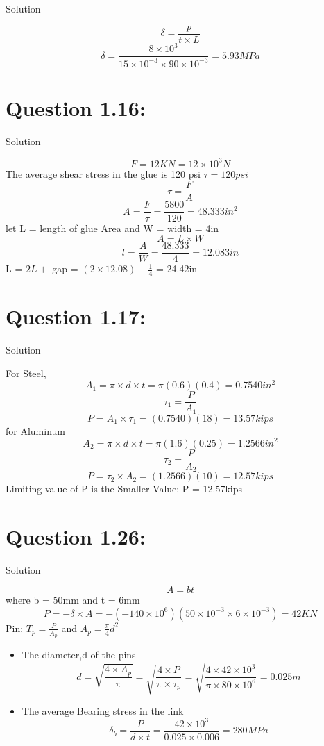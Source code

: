 \documentclass{article}
\begin{document}
\begin{center} Solution \end{center}

\[ \delta = \frac{p}{t \times L}\]
\[ \delta = \frac{8\times 10^{3}}{15 \times 10^{-3} \times 90 \times 10^{-3}} = 5.93MPa\]




\section*{\textbf{Question 1.16:}}

 \begin{center} Solution\end{center}

\[F = 12KN = 12 \times 10^{3}N\]
The average shear stress in the glue is 120 psi $\tau = 120psi$
\[\tau = \frac{F}{A} \]
\[A = \frac{F}{\tau} = \frac{5800}{120} = 48.333in^{2}\]
let L = length of glue Area and W =  width = 4in
\[A= L \times W\]
\[l = \frac{A}{W} = \frac{48.333}{4} = 12.083in\]
 L = $2L +$ gap = $(2\times 12.08)+ \frac{1}{4}$ = 24.42in

\section*{\textbf{Question 1.17:}}

\begin{center} Solution \end{center}
For Steel, 
\[A_{1} = \pi \times d\times t= \pi (0.6)(0.4) = 0.7540in^{2}\]
\[\tau_{1} = \frac{P}{A_{1}}\]
\[P = A_{1}\times\tau_{1} = (0.7540)(18) = 13.57kips\]
for Aluminum 
\[A_{2} = \pi\times d\times t = \pi(1.6)(0.25) = 1.2566in^{2}\]
\[\tau_{2} = \frac{P}{A_{2}}\]
\[P= \tau_{2} \times A_{2} = (1.2566)(10)= 12.57kips\]
Limiting value of P is the Smaller Value: P = 12.57kips



\section*{\textbf{Question 1.26:}}

\begin{center} Solution \end{center}
\[A = bt\]
where b = 50mm and t = 6mm
\[P = -\delta \times A = -(-140 \times 10^{6})(50 \times 10^{-3} \times 6 \times 10^{-3}) = 42KN\]
Pin: $ T_{p} = \frac{P}{A_{p}} $ and $A_{p} = \frac{\pi}{4}d^{2}$
\begin{itemize}
\item The diameter,d of the pins
\[d = \sqrt{\frac{4\times A_{p}}{\pi}} = \sqrt{\frac{4\times P}{\pi\times\tau_{p}}} = \sqrt{\frac{4\times 42 \times 10^{3}}{\pi \times 80 \times 10^{6}}} = 0.025m\]
\item The average Bearing stress in the link
\[\delta_{b} = \frac{P}{d\times t} = \frac{42\times10^{3}}{0.025\times0.006} = 280MPa\]
\end{itemize}
\end{document}
